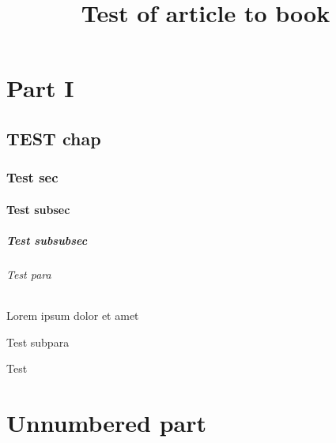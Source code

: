 \documentclass[10pt]{article}
\title{Test of article to book}
\begin{document}
    \tableofcontents
    
    
    \part{Part I}
    
    \chapter{TEST chap}
    \section{Test sec}
    \subsection{Test subsec}
    \subsubsection{Test subsubsec}
    \paragraph{Test para} Lorem ipsum dolor et amet
    \subparagraph{Test subpara}
    Test
    \part*{Unnumbered part}
\end{document}
